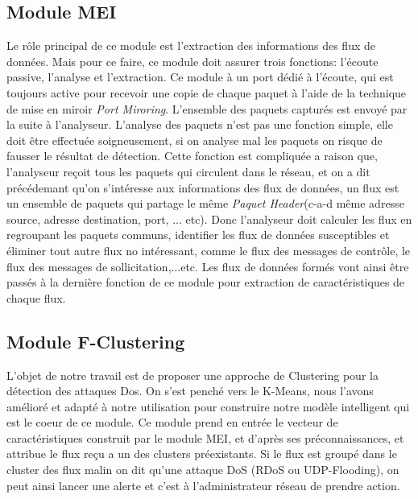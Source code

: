 \newpage
\subsection{Module MEI}
Le rôle principal de ce module est l'extraction des informations des flux de données. Mais pour ce faire, ce module doit assurer trois fonctions: l'écoute passive, l'analyse et l'extraction. Ce module à un port dédié à l'écoute, qui est toujours active pour recevoir une copie de chaque paquet à l'aide de la technique de mise en miroir \textit{Port Miroring}. L'ensemble des paquets capturés est envoyé par la suite à l'analyseur. L'analyse des paquets n'est pas une fonction simple, elle doit être effectuée soigneusement, si on analyse mal les paquets on risque de fausser le résultat de détection. Cette fonction est compliquée a raison que, l'analyseur reçoit tous les paquets qui circulent dans le réseau, et on a dit précédemant qu'on s'intéresse aux informations des flux de données, un flux est un ensemble de paquets qui partage le même \textit{Paquet Header}(c-a-d même adresse source, adresse destination, port, ... etc). Donc l'analyseur doit calculer les flux en regroupant les paquets communs, identifier les flux de données susceptibles et éliminer tout autre flux no intéressant, comme le flux des messages de contrôle, le flux des messages de sollicitation,...etc. Les flux de données formés vont ainsi être passés à la dernière fonction de ce module pour extraction de caractéristiques de chaque flux.

\newpage
\subsection{Module F-Clustering}
L'objet de notre travail est de proposer une approche de Clustering pour la détection des attaques Dos. On s'est penché vers le K-Means, nous l'avons amélioré et adapté à notre utilisation pour construire notre modèle intelligent qui est le coeur de ce module. Ce module prend en entrée le vecteur de caractéristiques construit par le module MEI, et d'après ses préconnaissances, et attribue le flux reçu a un des clusters préexistants. Si le flux est groupé dans le cluster des flux malin on dit qu'une attaque DoS (RDoS ou UDP-Flooding), on peut ainsi lancer une alerte et c'est à l'administrateur réseau de prendre action.

